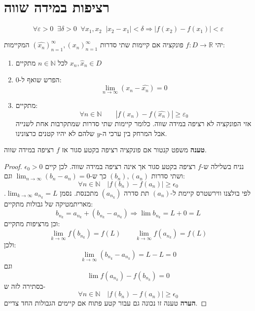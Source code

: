 \documentclass{tstextbook}
\begin{document}
\section{רציפות במידה שווה}

\begin{definition}
$$\forall \varepsilon>0 \;\;\exists\delta>0 \;\;\forall x_1, x_2 \;\;|x_2-x_1|<\delta \Rightarrow |f(x_2)-f(x_1)|<\varepsilon$$

\end{definition}
\begin{proposition}
יהי \(f:D\to \mathbb{R}\) פונקציה אם קיימות שתי סדרות \((\hat{x_n})_{n=1}^\infty, (x_n)_{n=1}^\infty\) המקיימות:

  \begin{enumerate}
    \item לכל \(n \in \mathbb{N}\) מתקיים \(x_{n},\hat{x}_{n}\in D\)


    \item הפרש שואף ל-0: 
$$\lim_{n\to\infty} (x_n-\hat{x_n})=0$$


    \item מתקיים: 
 $$\forall n\in\mathbb N \qquad |f(x_n)-f(\hat{x_n})|\geq \varepsilon_0$$
 אזי הפונקציה לא רציפה במידה שווה. כלומר קיימות שתי סדרות שמתקרבות אחת לשנייה אבל המרחק בין ערכי ה-\(y\) שלהם לא יהיו קטנים כרצונינו.


  \end{enumerate}
\end{proposition}
\textbf{טענה} משפט קנטור
 אם פונקציה רציפה בקטע סגור אז \(f\) רציפה במידה שווה.

\begin{proof}
נניח בשלילה ש-\(f\) רציפה בקטע סגור אך אינה רציפה במידה שווה. לכן קיים \(\epsilon_0 > 0\) ושתי סדרות \((b_n), (a_n)\) כך ש-\(\lim_{n\to\infty}(b_n-a_n) = 0\) וגם:
$$\forall n\in\mathbb N\quad |f(b_n)-f(a_n)|\geq \epsilon_0$$
לפי בולצנו ווירשטרס קיימת ל-\((a_n)\) תת סדרה \((a_{n_k})\) מתכנסת. נסמן \(\lim_{k\to\infty} a_{n_k}=L\).
מאריתמטיקה של גבולות מתקיים:
$$b_{n_k} = a_{n_k}+(b_{n_k}- a_{n_k}) \Rightarrow \lim  b_{n_k} = L+0=L$$
וכן מרציפות מתקיים:
$$\lim_{k\rightarrow \infty} f(b_{n_k})=f(L)\qquad \lim_{k\rightarrow \infty} f(a_{n_k})=f(L)$$
ולכן:
$$\lim_{k\rightarrow \infty} (b_{n_k}-a_{n_k})=L-L=0$$
וגם $$\lim f(a_{n_k}) - f(b_{n_k})=0$$
בסתירה לזה ש-$$\forall n\in\mathbb N\quad |f(b_n)-f(a_n)|\geq \epsilon_0$$\textbf{הערה}
טענה זו נכונה גם עבור קטע פתוח אם קיימים הגבולות החד צדיים.

\end{proof}
\end{document}
